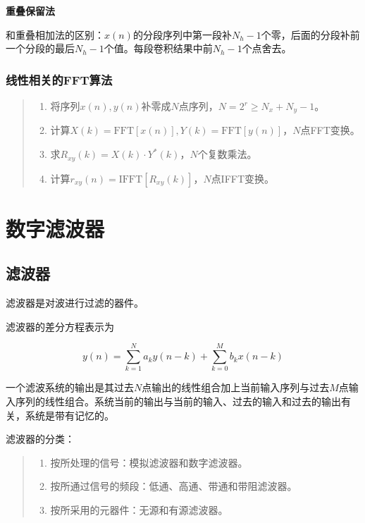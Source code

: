 \documentclass[cn, hazy, blue, normal, 12pt]{elegantnote}
\begin{document}
\textbf{重叠保留法}

和重叠相加法的区别：$x(n)$的分段序列中第一段补$N_h-1$个零，后面的分段补前一个分段的最后$N_h-1$个值。每段卷积结果中前$N_h-1$个点舍去。

\subsubsection{线性相关的FFT算法}

\begin{quote}
\begin{enumerate}
    \item 将序列$x(n), y(n)$补零成$N$点序列，$N=2^r\geq N_x+N_y-1$。
    \item 计算$X(k)=\text{FFT}[x(n)], Y(k)=\text{FFT}[y(n)]$，$N$点FFT变换。
    \item 求$R_{xy}(k)=X(k)\cdot Y^*(k)$，$N$个复数乘法。
    \item 计算$r_{xy}(n)=\text{IFFT}[R_{xy}(k)]$，$N$点IFFT变换。
\end{enumerate}
\end{quote}

\section{数字滤波器}

\subsection{滤波器}

滤波器是对波进行过滤的器件。

滤波器的差分方程表示为

\begin{equation}
    y(n)=\sum_{k=1}^{N}a_k y(n-k)+\sum_{k=0}^{M}b_k x(n-k)
\end{equation}

一个滤波系统的输出是其过去$N$点输出的线性组合加上当前输入序列与过去$M$点输入序列的线性组合。系统当前的输出与当前的输入、过去的输入和过去的输出有关，系统是带有记忆的。

滤波器的分类：

\begin{quote}
\begin{enumerate}
    \item 按所处理的信号：模拟滤波器和数字滤波器。
    \item 按所通过信号的频段：低通、高通、带通和带阻滤波器。
    \item 按所采用的元器件：无源和有源滤波器。
\end{enumerate}
\end{quote}
\end{document}
